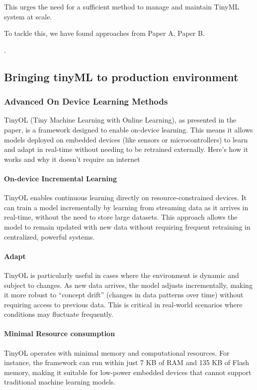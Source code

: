 \documentclass[twocolumn]{article}
\begin{document}
This urges the need for a sufficient method to manage and maintain TinyML system at scale.

To tackle this, we have found approaches from Paper A, Paper B.

\cite{hussein_original_2024, paul_rethinking_2021, de_prado_robustifying_2020,ren_synergy_2021,roshan_adaptive_2021}.


\subsection{Bringing tinyML to production environment}
\subsubsection{Advanced On Device Learning Methods }
TinyOL (Tiny Machine Learning with Online Learning), as presented in the paper, is a framework designed to enable on-device learning. This means it allows models deployed on embedded devices (like sensors or microcontrollers) to learn and adapt in real-time without needing to be retrained externally. Here’s how it works and why it doesn’t require an internet 
\paragraph{On-device Incremental Learning} TinyOL enables continuous learning directly on resource-constrained devices. It can train a model incrementally by learning from streaming data as it arrives in real-time, without the need to store large datasets. This approach allows the model to remain updated with new data without requiring frequent retraining in centralized, powerful systems.
\paragraph{Adapt} TinyOL is particularly useful in cases where the environment is dynamic and subject to changes. As new data arrives, the model adjusts incrementally, making it more robust to “concept drift” (changes in data patterns over time) without requiring access to previous data. This is critical in real-world scenarios where conditions may fluctuate frequently. 
\paragraph{Minimal Resource consumption}TinyOL operates with minimal memory and computational resources. For instance, the framework can run within just 7 KB of RAM and 135 KB of Flash memory, making it suitable for low-power embedded devices that cannot support traditional machine learning models.
\end{document}
